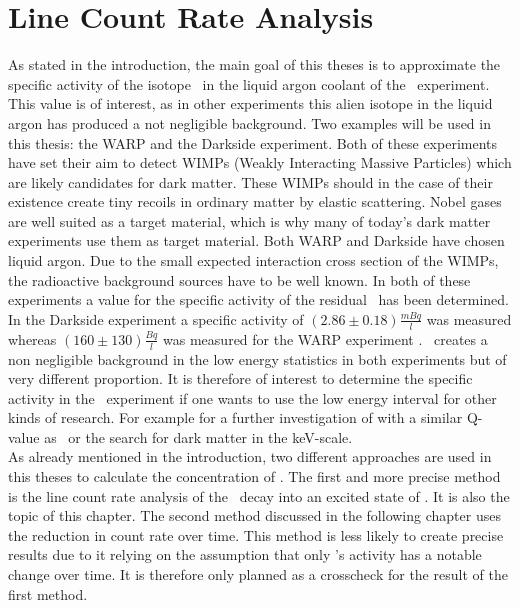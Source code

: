 \documentclass[encoding=utf8,british]{tumphthesis}
\begin{document}

 
\chapter{Line Count Rate Analysis}
\label{sec:SAfrom514}


As stated in the introduction, the main goal of this theses is to approximate the specific activity of the isotope \Kr\ in the liquid argon coolant of the \gerda\ experiment. 
This value is of interest, as in other experiments this alien isotope in the liquid argon has produced a not negligible background. 
Two examples will be used in this thesis: the WARP and the Darkside experiment.
Both of these experiments have set their aim to detect WIMPs (Weakly Interacting Massive Particles) which are likely candidates for dark matter.
These WIMPs should in the case of their existence create tiny recoils in ordinary matter by elastic scattering.
Nobel gases are well suited as a target material, which is why many of today's dark matter experiments use them as target material.
Both WARP and Darkside have chosen liquid argon.
Due to the small expected interaction cross section of the WIMPs, the radioactive background sources have to be well known.
In both of these experiments a value for the specific activity of the residual \Kr\ has been determined.
In the Darkside experiment a specific activity of  \((2.86\pm0.18) \frac{\unit{mBq}}{\unit{l}}\)  \cite{agnes_results_2016} was measured whereas  \((160\pm130)\frac{\unit{Bq}}{\unit{l}}\) was measured for the WARP experiment \cite{benetti_measurement_2006}.
\Kr\ creates a non negligible background in the low energy statistics in both experiments but of very different proportion. 
It is therefore of interest to determine the specific activity in the \gerda\ experiment if one wants to use the low energy interval for other kinds of research.
For example for a further investigation of  with a similar Q-value as \Kr\ or the search for dark matter in the keV-scale.
\\

As already mentioned in the introduction, two different approaches are used in this theses to calculate the concentration of \Kr. 
The first and more precise method is the line count rate analysis of the \Kr\ decay into an excited state of . 
It is also the topic of this chapter.
The second method discussed in the following chapter uses the reduction in count rate over time. 
This method is less likely to create precise results due to it relying on the assumption that only \Kr's activity has a notable change over time.
It is therefore only planned as a crosscheck for the result of the first method.
\\
\end{document}
